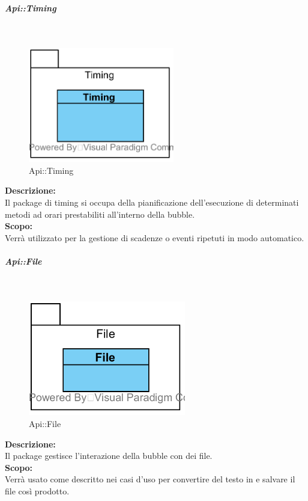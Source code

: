 \begin{samepage}
\subparagraph{Api\-::Timing}\label{api-timing}\mbox{}\\
\nopagebreak
\begin{figure}[H]
	\centering
	\includegraphics[height=5cm]{diagrammi_img/classi_e_package/api_timing.png}
	\caption{Api\-::Timing}
\end{figure}
\end{samepage}
\textbf{Descrizione:}\\
Il package di timing si occupa della pianificazione dell'esecuzione di determinati metodi ad orari prestabiliti all'interno della bubble.\\
\textbf{Scopo:}\\
Verrà utilizzato per la gestione di scadenze o eventi ripetuti in modo automatico.

\begin{samepage}
\subparagraph{Api\-::File}\label{api-file}\mbox{}\\
\nopagebreak
\begin{figure}[H]
	\centering
	\includegraphics[height=5cm]{diagrammi_img/classi_e_package/api_file.png}
	\caption{Api\-::File}
\end{figure}
\end{samepage}
\textbf{Descrizione:}\\ 
Il package gestisce l'interazione della bubble con dei file.\\ 
\textbf{Scopo:}\\
Verrà usato come descritto nei casi d'uso per convertire del testo in  e salvare il file così prodotto.

